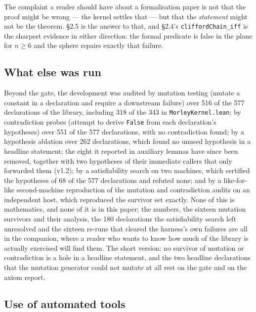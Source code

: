 \documentclass[11pt]{article}
\theoremstyle{definition}
\theoremstyle{remark}
\begin{document}
The complaint a reader should have about a formalisation paper is not that the proof might be wrong --- the
kernel settles that --- but that the \emph{statement} might not be the theorem. \S{}2.5 is the answer to that, and
\S{}2.4's \texttt{cliffordChain\_\allowbreak iff} is the sharpest evidence in either direction: the formal predicate is false in
the plane for \(n \ge 6\) and the sphere repairs exactly that failure.

\hypertarget{what-else-was-run}{%
\subsection{What else was run}\label{what-else-was-run}}

Beyond the gate, the development was audited by mutation testing (mutate a constant in a declaration and
require a downstream failure) over 516 of the 577 declarations of the library, including 318 of the 343 in
\texttt{MorleyKernel.\allowbreak lean}; by contradiction probes (attempt to derive \texttt{False} from each declaration's
hypotheses) over 551 of the 577 declarations, with no contradiction found; by a hypothesis ablation over
262 declarations, which found no unused hypothesis in a headline statement; the eight it reported in
auxiliary lemmas have since been removed, together with two hypotheses of their immediate callers that
only forwarded them (v1.2); by a satisfiability search on two machines, which certified the hypotheses of 68 of the 577
declarations and refuted none; and by a like-for-like second-machine reproduction of the mutation and
contradiction audits on an independent host, which reproduced the survivor set exactly. None of this is
mathematics, and none of it is in this paper; the numbers, the sixteen mutation survivors and their
analysis, the 180 declarations the satisfiability search left unresolved and the sixteen re-runs that
cleared the harness's own failures are all in the companion, where a reader who wants to know how much of
the library is actually exercised will find them. The short version: no survivor of mutation or
contradiction is a hole in a headline statement, and the two headline declarations that the mutation
generator could not mutate at all rest on the gate and on the axiom report.

\hypertarget{use-of-automated-tools}{%
\subsection{Use of automated tools}\label{use-of-automated-tools}}
\end{document}
